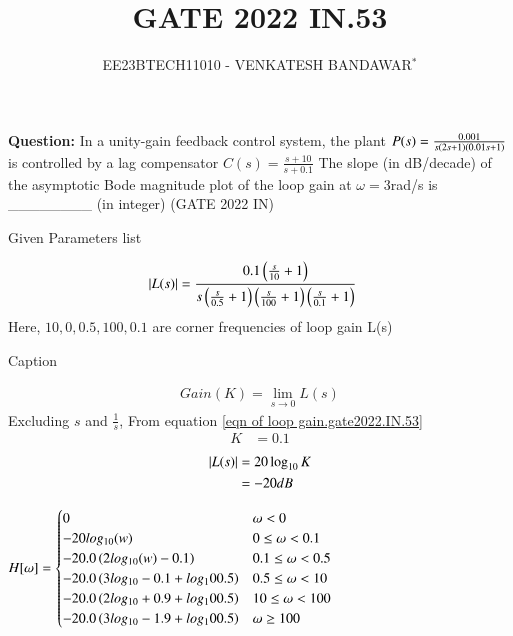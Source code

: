 \documentclass[journal,12pt,twocolumn]{IEEEtran}
\theoremstyle{remark}
\begin{document}

\vspace{3cm}

\title{GATE 2022 IN.53}
\author{EE23BTECH11010 - VENKATESH BANDAWAR$^{*}$%
}
\maketitle
\newpage
\bigskip
\textbf{Question:} In a unity-gain feedback control system, the plant
$P(s) = \frac{0.001}{s\left(2s+1\right)\left(0.01s+1\right)}$
is controlled by a lag compensator
$C(s) = \frac{s+10}{s+0.1}$
The slope (in dB/decade) of the asymptotic Bode magnitude plot of the loop gain
at $\omega= 3 $rad/s is \_\_\_\_\_\_\_\_ (in integer)
\hfill(GATE 2022 IN)\\
\solution
\begin{table}[!h]
    \centering
    
    \caption{Given Parameters list}
    \label{tab:Given Parameters list.gate2022.IN.53}
\end{table}
\begin{align}
    \left\vert L(s)\right\vert &= \frac{0.1\left(\frac{s}{10}+1\right)}{s\left(\frac{s}{0.5}+1\right)\left(\frac{s}{100}+1\right)\left(\frac{s}{0.1}+1\right)}\label{eqn of loop gain.gate2022.IN.53}
\end{align}
Here, $10,0,0.5,100,0.1$ are corner frequencies of loop gain L(s) 

\begin{table}[!h]
    \centering
    
    \caption{Caption}
    \label{tab:corner frequency.gate2022.IN.53}
\end{table}

\begin{align}
    Gain(K) = \lim_{s\rightarrow 0} L(s)
\end{align}
Excluding $s$ and $\frac{1}{s}$, From equation \eqref{eqn of loop gain.gate2022.IN.53}
\begin{align}
    K &= 0.1
\end{align}
\begin{align}
    \left\vert L(s)\right\vert &= 20\log_{10} K\\
    &= -20 dB
\end{align}

$H[\omega] = \begin{cases} 
    0 &  \omega < 0 \\
    -20 log_{10}(w) &  0 \leq \omega < 0.1 \\
    -20.0 \left(2log_{10}(w) - 0.1\right)  &  0.1 \leq \omega < 0.5 \\
    -20.0 \left(3log_{10} - 0.1 + log_10{0.5}\right)  &  0.5 \leq \omega < 10 \\
    -20.0 \left(2log_{10} + 0.9 + log_10{0.5}\right)  &  10 \leq \omega < 100 \\
    -20.0 \left(3log_{10} - 1.9 + log_10{0.5}\right)  &  \omega \geq 100 \\
\end{cases}$
\end{document}
